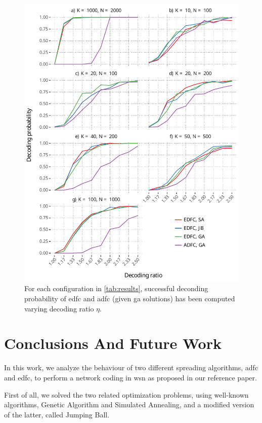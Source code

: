 \documentclass[12pt,journal,draftclsnofoot,onecolumn]{IEEEtran}
\begin{document}
\begin{figure}[htp]
	\includegraphics[]{figures/eta_vs_prob_reliable_ones.pdf}
	\caption{For each configuration in \autoref{tab:results}, successful deconding probability of \gls{edfc} and \gls{adfc} (given \gls{ga} solutions) has been computed varying decoding ratio $\eta$.}
	\label{fig:eta_vs_prob_reliable_ones}
\end{figure}

\clearpage
\section{Conclusions And Future Work}\label{sec:conclusions}
In this work, we analyze the behaviour of two different spreading algorithms, \gls{adfc} and \gls{edfc}, to perform a network coding in \gls{wsn} as proposed in our reference paper.\cite{Lin2007}

First of all, we solved the two related optimization problems, using well-known algorithms, Genetic Algorithm and Simulated Annealing, and a modified version of the latter, called Jumping Ball.
\end{document}
